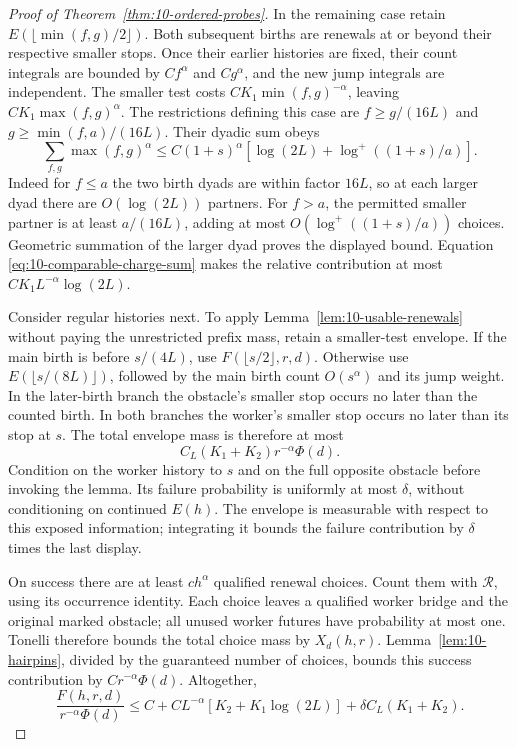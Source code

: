 \begin{proof}[Proof of Theorem~\ref{thm:10-ordered-probes}]
In the remaining case retain
\(E(\lfloor\min(f,g)/2\rfloor)\). Both subsequent births are renewals
at or beyond their respective smaller stops. Once their earlier
histories are fixed, their count integrals are bounded by
\(Cf^\alpha\) and \(Cg^\alpha\), and the new jump integrals are
independent. The smaller test costs
\(CK_1\min(f,g)^{-\alpha}\), leaving \(CK_1\max(f,g)^\alpha\).
The restrictions defining this case are
\(f\ge g/(16L)\) and \(g\ge\min(f,a)/(16L)\).
Their dyadic sum obeys
\[
 \sum_{f,g}\max(f,g)^\alpha
 \le C(1+s)^\alpha
       [\log(2L)+\log^+((1+s)/a)].
\]
Indeed for \(f\le a\) the two birth dyads are within factor \(16L\),
so at each larger dyad there are \(O(\log(2L))\) partners. For
\(f>a\), the permitted smaller partner is at least \(a/(16L)\),
adding at most \(O(\log^+((1+s)/a))\) choices. Geometric summation of
the larger dyad proves the displayed bound. Equation
\eqref{eq:10-comparable-charge-sum} makes the relative contribution at
most \(CK_1L^{-\alpha}\log(2L)\).

Consider regular histories next. To apply
Lemma~\ref{lem:10-usable-renewals} without paying the unrestricted prefix
mass, retain a smaller-test envelope. If the main birth is before
\(s/(4L)\), use \(F(\lfloor s/2\rfloor,r,d)\). Otherwise use
\(E(\lfloor s/(8L)\rfloor)\), followed by the main birth count
\(O(s^\alpha)\) and its jump weight. In the later-birth branch the obstacle's smaller
stop occurs no later than the counted birth. In both branches the
worker's smaller stop occurs no later than its stop at \(s\). The total envelope mass is therefore at most
\[
 C_L(K_1+K_2)r^{-\alpha}\Phi(d).
\]
Condition on the worker history to \(s\) and on the full opposite
obstacle before invoking the lemma. Its failure probability is uniformly
at most \(\delta\), without conditioning on continued \(E(h)\).
The envelope is measurable with respect to this exposed information;
integrating it bounds the failure contribution by \(\delta\) times the
last display.

On success there are at least \(ch^\alpha\) qualified renewal choices.
Count them with \(\mathcal R\), using its occurrence identity. Each
choice leaves a qualified worker bridge and the original marked
obstacle; all unused worker futures have probability at most one.
Tonelli therefore bounds the total choice mass by \(X_d(h,r)\).
Lemma~\ref{lem:10-hairpins}, divided by the guaranteed number of choices,
bounds this success contribution by \(Cr^{-\alpha}\Phi(d)\). Altogether,
\begin{equation}
 \frac{F(h,r,d)}{r^{-\alpha}\Phi(d)}
 \le C+CL^{-\alpha}[K_2+K_1\log(2L)]
        +\delta C_L(K_1+K_2).
 \label{eq:10-F-recursion}
\end{equation}


\end{proof}
